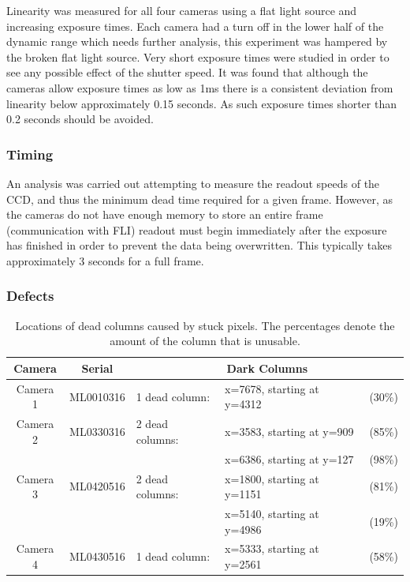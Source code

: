 \begin{colsection}
\begin{colsection}
Linearity was measured for all four cameras using a flat light source and increasing exposure times. Each camera had a turn off in the lower half of the dynamic range which needs further analysis, this experiment was hampered by the broken flat light source. Very short exposure times were studied in order to see any possible effect of the shutter speed. It was found that although the cameras allow exposure times as low as 1ms there is a consistent deviation from linearity below approximately 0.15 seconds. As such exposure times shorter than 0.2 seconds should be avoided.

\newpage
\subsubsection{Timing}

An analysis was carried out attempting to measure the readout speeds of the CCD, and thus the minimum dead time required for a given frame. However, as the cameras do not have enough memory to store an entire frame (communication with FLI) readout must begin immediately after the exposure has finished in order to prevent the data being overwritten. This typically takes approximately 3 seconds for a full frame.

\newpage
\subsubsection{Defects}

\begin{table}[t]
    \begin{center}
        \begin{tabular}{cc|lll} %
            Camera   & Serial    & \multicolumn{3}{c}{Dark Columns} \\
            \midrule
            Camera 1 & ML0010316 & 1 dead column:  & x=7678, starting at y=4312 & (30\%) \\
            Camera 2 & ML0330316 & 2 dead columns: & x=3583, starting at y=909  & (85\%) \\
                     &           &                 & x=6386, starting at y=127  & (98\%) \\
            Camera 3 & ML0420516 & 2 dead columns: & x=1800, starting at y=1151 & (81\%) \\
                     &           &                 & x=5140, starting at y=4986 & (19\%) \\
            Camera 4 & ML0430516 & 1 dead column:  & x=5333, starting at y=2561 & (58\%) \\
        \end{tabular}
    \end{center}
    \caption[TODO]{
        Locations of dead columns caused by stuck pixels. The percentages denote the amount of the column that is unusable.
    }\label{tab:frame}
\end{table}


\end{colsection}
\end{colsection}
